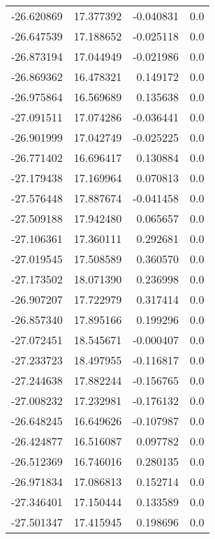 \begin{tabular}{rrrr}
      -26.620869 &        17.377392 &   -0.040831 &   0.0 \\
      -26.647539 &        17.188652 &   -0.025118 &   0.0 \\
      -26.873194 &        17.044949 &   -0.021986 &   0.0 \\
      -26.869362 &        16.478321 &    0.149172 &   0.0 \\
      -26.975864 &        16.569689 &    0.135638 &   0.0 \\
      -27.091511 &        17.074286 &   -0.036441 &   0.0 \\
      -26.901999 &        17.042749 &   -0.025225 &   0.0 \\
      -26.771402 &        16.696417 &    0.130884 &   0.0 \\
      -27.179438 &        17.169964 &    0.070813 &   0.0 \\
      -27.576448 &        17.887674 &   -0.041458 &   0.0 \\
      -27.509188 &        17.942480 &    0.065657 &   0.0 \\
      -27.106361 &        17.360111 &    0.292681 &   0.0 \\
      -27.019545 &        17.508589 &    0.360570 &   0.0 \\
      -27.173502 &        18.071390 &    0.236998 &   0.0 \\
      -26.907207 &        17.722979 &    0.317414 &   0.0 \\
      -26.857340 &        17.895166 &    0.199296 &   0.0 \\
      -27.072451 &        18.545671 &   -0.000407 &   0.0 \\
      -27.233723 &        18.497955 &   -0.116817 &   0.0 \\
      -27.244638 &        17.882244 &   -0.156765 &   0.0 \\
      -27.008232 &        17.232981 &   -0.176132 &   0.0 \\
      -26.648245 &        16.649626 &   -0.107987 &   0.0 \\
      -26.424877 &        16.516087 &    0.097782 &   0.0 \\
      -26.512369 &        16.746016 &    0.280135 &   0.0 \\
      -26.971834 &        17.086813 &    0.152714 &   0.0 \\
      -27.346401 &        17.150444 &    0.133589 &   0.0 \\
      -27.501347 &        17.415945 &    0.198696 &   0.0 \\

\end{tabular}
